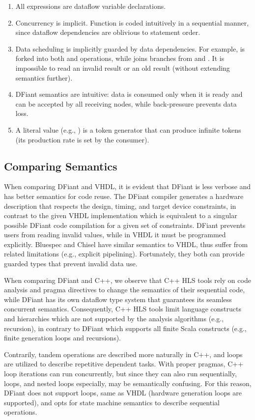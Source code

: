 \begin{enumerate}[leftmargin=*]
  \item All expressions are dataflow variable declarations.
  \item Concurrency is implicit. Function  is coded intuitively in a sequential manner, since dataflow dependencies are oblivious to statement order. 
  \item Data scheduling is implicitly guarded by data dependencies. For example,  is forked into both  and  operations, while  joins branches from  and .
  It is impossible to read an invalid result or an old result (without extending semantics further).
  \item DFiant semantics are intuitive: data is consumed only when it is ready and can be accepted by all receiving nodes, while back-pressure prevents data loss. 
  \item A literal value (e.g., ) is a token generator that can produce infinite tokens (its production rate is set by the consumer).
\end{enumerate} 
   

\subsection{Comparing Semantics}
When comparing DFiant and VHDL, it is evident that DFiant is less verbose and has better semantics for code reuse. The DFiant compiler generates a hardware description that respects the design, timing, and target device constraints, in contrast to the given VHDL implementation which is equivalent to a singular possible DFiant code compilation for a given set of constraints.
DFiant prevents  users from reading invalid values, while in VHDL it must be programmed explicitly. Bluespec and Chisel have similar semantics to VHDL, thus suffer from related limitations (e.g., explicit pipelining). Fortunately, they both can provide guarded types that prevent invalid data use.

When comparing DFiant and C++, we observe that C++ HLS tools rely on code analysis and pragma directives to change the semantics of their sequential code, while DFiant has its own dataflow type system that guarantees its seamless concurrent semantics. Consequently, C++ HLS tools limit language constructs and hierarchies which are not supported by the analysis algorithms (e.g., recursion), in contrary to DFiant which supports all finite Scala constructs (e.g., finite generation loops and recursions). 

Contrarily, tandem operations are described more naturally in C++, and loops are utilized to describe repetitive dependent tasks. With proper pragmas, C++ loop iterations can run concurrently, but since they can also run sequentially, loops, and nested loops especially, may be semantically confusing. For this reason, DFiant does not support loops, same as VHDL (hardware generation loops are supported), and opts for state machine semantics to describe sequential operations. %
